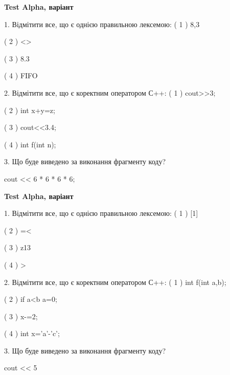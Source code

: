 \documentclass[11pt, ukrainian]{article}
\begin{document}
\begin{large}
\textbf{Test Alpha, варіант }\par

1. Відмітити все, що є однією правильною лексемою:
( 1 ) 8,3

( 2 ) <>

( 3 ) 8.3

( 4 ) FIFO


2. Відмітити все, що є коректним оператором С++:
( 1 ) cout>>3;

( 2 ) int x+y=z;

( 3 ) cout<<3.4;

( 4 ) int f(int n);


3. Що буде виведено за виконання фрагменту коду?

cout << 6 * 6 * 6 * 6;

\end{large}
\vspace{20mm}
\begin{large}
\textbf{Test Alpha, варіант }\par

1. Відмітити все, що є однією правильною лексемою:
( 1 ) [1]

( 2 ) =<

( 3 ) z13

( 4 ) >


2. Відмітити все, що є коректним оператором С++:
( 1 ) int f(int a,b);

( 2 ) if a<b a=0;

( 3 ) x-=2;

( 4 ) int x='a'-'c';


3. Що буде виведено за виконання фрагменту коду?

cout << 5 %

\end{large}
\newpage
\end{document}
